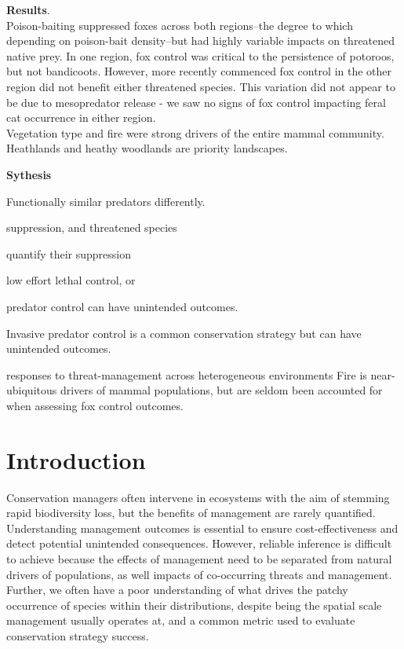 \documentclass[11pt,a4paper,titlepage,twoside,openright]{style/unimelbthesis}
\begin{document}
\begin{mainmatter}
\textbf{Results}.\\
Poison-baiting suppressed foxes across both regions--the degree to which depending on poison-bait density--but had highly variable impacts on threatened native prey. In one region, fox control was critical to the persistence of potoroos, but not bandicoots. However, more recently commenced fox control in the other region did not benefit either threatened species. This variation did not appear to be due to mesopredator release - we saw no signs of fox control impacting feral cat occurrence in either region.\\
Vegetation type and fire were strong drivers of the entire mammal community.
Heathlands and heathy woodlands are priority landscapes.

\textbf{Sythesis}

Functionally similar predators differently.

suppression, and threatened species

quantify their suppression

low effort lethal control, or

predator control can have unintended outcomes.

Invasive predator control is a common conservation strategy but can have unintended outcomes.

responses to threat-management across heterogeneous environments
Fire is near-ubiquitous drivers of mammal populations, but are seldom been accounted for when assessing fox control outcomes.

\newpage

\hypertarget{introduction-1}{%
\section{Introduction}\label{introduction-1}}

Conservation managers often intervene in ecosystems with the aim of stemming rapid biodiversity loss, but the benefits of management are rarely quantified. Understanding management outcomes is essential to ensure cost-effectiveness and detect potential unintended consequences. However, reliable inference is difficult to achieve because the effects of management need to be separated from natural drivers of populations, as well impacts of co-occurring threats and management. Further, we often have a poor understanding of what drives the patchy occurrence of species within their distributions, despite being the spatial scale management usually operates at, and a common metric used to evaluate conservation strategy success.


\end{mainmatter}
\end{document}
